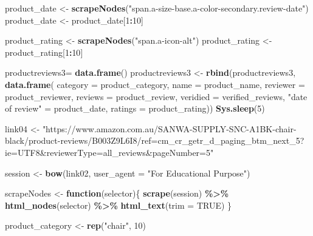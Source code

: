 \documentclass[
]{article}
\newenvironment{Shaded}{\begin{snugshade}}{\end{snugshade}}
\newcommand{\AttributeTok}[1]{\textcolor[rgb]{0.13,0.29,0.53}{#1}}
\newcommand{\ConstantTok}[1]{\textcolor[rgb]{0.56,0.35,0.01}{#1}}
\newcommand{\ControlFlowTok}[1]{\textcolor[rgb]{0.13,0.29,0.53}{\textbf{#1}}}
\newcommand{\DecValTok}[1]{\textcolor[rgb]{0.00,0.00,0.81}{#1}}
\newcommand{\FunctionTok}[1]{\textcolor[rgb]{0.13,0.29,0.53}{\textbf{#1}}}
\newcommand{\NormalTok}[1]{#1}
\newcommand{\OtherTok}[1]{\textcolor[rgb]{0.56,0.35,0.01}{#1}}
\newcommand{\SpecialCharTok}[1]{\textcolor[rgb]{0.81,0.36,0.00}{\textbf{#1}}}
\newcommand{\StringTok}[1]{\textcolor[rgb]{0.31,0.60,0.02}{#1}}
\begin{document}
\begin{Shaded}
\begin{Highlighting}[]
\NormalTok{  product\_date }\OtherTok{\textless{}{-}} \FunctionTok{scrapeNodes}\NormalTok{(}\StringTok{"span.a{-}size{-}base.a{-}color{-}secondary.review{-}date"}\NormalTok{)}
\NormalTok{  product\_date }\OtherTok{\textless{}{-}}\NormalTok{ product\_date[}\DecValTok{1}\SpecialCharTok{:}\DecValTok{10}\NormalTok{]}
  
\NormalTok{  product\_rating }\OtherTok{\textless{}{-}} \FunctionTok{scrapeNodes}\NormalTok{(}\StringTok{"span.a{-}icon{-}alt"}\NormalTok{)}
\NormalTok{  product\_rating }\OtherTok{\textless{}{-}}\NormalTok{ product\_rating[}\DecValTok{1}\SpecialCharTok{:}\DecValTok{10}\NormalTok{]}
  
\NormalTok{  productreviews3}\OtherTok{=} \FunctionTok{data.frame}\NormalTok{()}
\NormalTok{  productreviews3 }\OtherTok{\textless{}{-}} \FunctionTok{rbind}\NormalTok{(productreviews3, }\FunctionTok{data.frame}\NormalTok{(}
                      \AttributeTok{category =}\NormalTok{ product\_category,}
                      \AttributeTok{name =}\NormalTok{ product\_name,}
                      \AttributeTok{reviewer =}\NormalTok{ product\_reviewer,}
                      \AttributeTok{reviews =}\NormalTok{ product\_review,}
                      \AttributeTok{veridied =}\NormalTok{ verified\_reviews,}
                      \StringTok{"date of review"} \OtherTok{=}\NormalTok{ product\_date,}
                      \AttributeTok{ratings =}\NormalTok{ product\_rating))}
  \FunctionTok{Sys.sleep}\NormalTok{(}\DecValTok{5}\NormalTok{)}
  
\NormalTok{link04 }\OtherTok{\textless{}{-}} \StringTok{"https://www.amazon.com.au/SANWA{-}SUPPLY{-}SNC{-}A1BK{-}chair{-}black/product{-}reviews/B003Z9L6I8/ref=cm\_cr\_getr\_d\_paging\_btm\_next\_5?ie=UTF8\&reviewerType=all\_reviews\&pageNumber=5"}


\NormalTok{  session }\OtherTok{\textless{}{-}} \FunctionTok{bow}\NormalTok{(link02,}
               \AttributeTok{user\_agent =} \StringTok{"For Educational Purpose"}\NormalTok{)}

\NormalTok{  scrapeNodes }\OtherTok{\textless{}{-}} \ControlFlowTok{function}\NormalTok{(selector)\{}
    \FunctionTok{scrape}\NormalTok{(session) }\SpecialCharTok{\%\textgreater{}\%}
      \FunctionTok{html\_nodes}\NormalTok{(selector) }\SpecialCharTok{\%\textgreater{}\%}
      \FunctionTok{html\_text}\NormalTok{(}\AttributeTok{trim =} \ConstantTok{TRUE}\NormalTok{)}
\NormalTok{  \}}

\NormalTok{  product\_category }\OtherTok{\textless{}{-}} \FunctionTok{rep}\NormalTok{(}\StringTok{"chair"}\NormalTok{, }\DecValTok{10}\NormalTok{)}


\end{Highlighting}
\end{Shaded}
\end{document}
